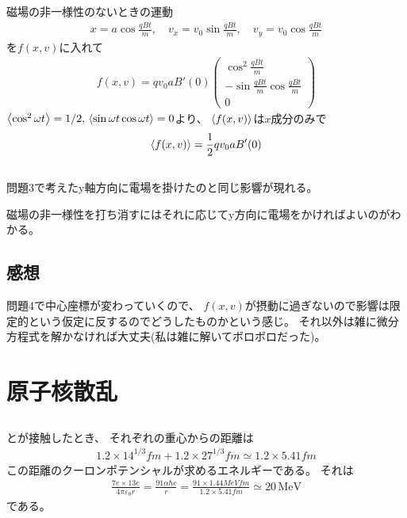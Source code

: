 \documentclass[../../master.tex]{subfiles}
\begin{document}
\subsection{}
磁場の非一様性のないときの運動
\begin{align}
    x = a\cos\frac{qBt}{m},\quad v_x = v_0\sin\frac{qBt}{m},\quad v_y = v_0\cos\frac{qBt}{m}
\end{align}
を\(f(x,v)\)に入れて
\begin{align}
    f(x,v) = qv_0 aB'(0)\begin{pmatrix}
        \cos^2\frac{qBt}{m}\\
        -\sin\frac{qBt}{m}\cos\frac{qBt}{m}\\
        0
    \end{pmatrix}
\end{align}
\(\ev{\cos^2\omega t}=1/2,\,\ev{\sin\omega t\cos\omega t}=0\)より、
\(\ev{f(x,v)}\)は\(x\)成分のみで
\begin{align}
    \ev{f(x,v)} = \frac{1}{2}qv_0a B'(0)
\end{align}

\subsection{}
問題3で考えたy軸方向に電場を掛けたのと同じ影響が現れる。

磁場の非一様性を打ち消すにはそれに応じてy方向に電場をかければよいのがわかる。


\subsection*{感想}
問題4で中心座標が変わっていくので、
\(f(x,v)\)が摂動に過ぎないので影響は限定的という仮定に反するのでどうしたものかという感じ。
それ以外は雑に微分方程式を解かなければ大丈夫(私は雑に解いてボロボロだった)。

\clearpage
\section{原子核散乱}
\subsection{}
とが接触したとき、
それぞれの重心からの距離は
\begin{align}
    1.2\times 14^{1/3} \si{fm} +1.2\times 27^{1/3}\si{fm} \simeq 1.2 \times 5.41 \si{fm}
\end{align}
この距離のクーロンポテンシャルが求めるエネルギーである。
それは
\begin{align}
    \frac{7e\times 13e}{4\pi\varepsilon_0 r} = \frac{91\alpha \hbar c}{r}
    = \frac{91 \times 1.44 \si{MeV fm}}{1.2\times 5.41 \si {fm}}\simeq 20 \,\text{MeV}
\end{align}
である。
\end{document}

